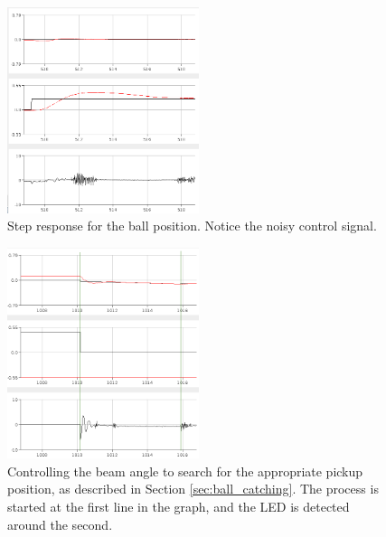 \begin{figure}[h]
\centering
\includegraphics[width=0.5\textwidth]{figures/stepresponseball1-crop.png}
\caption{Step response for the ball position. Notice the noisy control signal.}
\label{fig:stepresponseball}
\end{figure}

\begin{figure}[h]
\centering
\includegraphics[width=0.5\textwidth]{figures/topickupposition-crop.png}
\caption{Controlling the beam angle to search for the appropriate pickup position, as described in Section \ref{sec:ball_catching}. The process is started at the first line in the graph, and the LED is detected around the second.}
\label{fig:topickupposition}
\end{figure}

